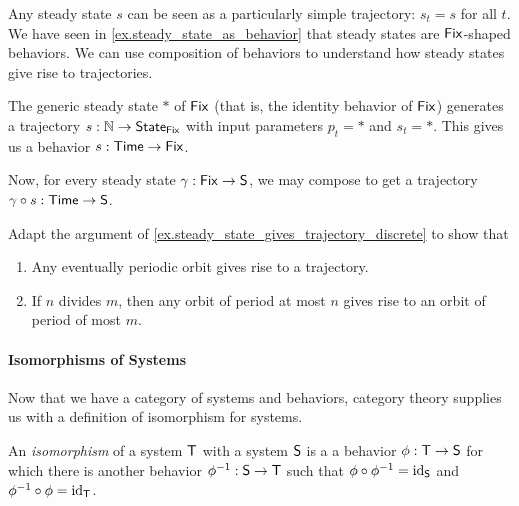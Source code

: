 \documentclass[DynamicalBook]{subfiles}
\begin{document}
\begin{example}\label{ex.steady_state_gives_trajectory_discrete}
  Any steady state $s$ can be seen as a particularly simple trajectory: $s_t =
  s$ for all $t$. We have seen in
  \cref{ex.steady_state_as_behavior}
  that steady states are $\mathsf{Fix}$-shaped behaviors. We can use composition of behaviors to
  understand how steady states give rise to trajectories.

  The generic steady state $\ast$ of $\mathsf{Fix}$ (that is, the identity behavior of
  $\mathsf{Fix}$) generates a trajectory $s : \mathbb{N} \to \mathsf{State}_{\mathsf{Fix}}$ with input
  parameters $p_t = \ast$ and $s_t = \ast$. This gives us a behavior $s :
  \mathsf{Time} \to \mathsf{Fix}$.
  
  Now, for every steady state $\gamma : \mathsf{Fix} \to \mathsf{S}$, we may compose
  to get a trajectory $\gamma \circ s : \mathsf{Time} \to \mathsf{S}$.
\end{example}

\begin{exercise}\label{ex.behaviors_as_change_of_kind_discrete}
Adapt the argument of \cref{ex.steady_state_gives_trajectory_discrete} to show
that
\begin{enumerate}
  \item Any eventually periodic orbit gives rise to a trajectory.
  \item If $n$ divides $m$, then any orbit of period at most $n$ gives rise to
    an orbit of period of most $m$.
\qedhere
\end{enumerate}
\end{exercise}


\paragraph{Isomorphisms of Systems}

Now that we have a category of systems and behaviors, category theory supplies
us with a definition of isomorphism for systems. 
\begin{definition}\label{def.isomorphism_of_systems_discrete}
  An \emph{isomorphism} of a system $\mathsf{T}$ with a system $\mathsf{S}$ is a
  a behavior $\phi : \mathsf{T} \to \mathsf{S}$ for which there is another behavior
  $\phi^{-1} : \mathsf{S} \to \mathsf{T}$ such that $\phi \circ \phi ^{-1} =
  \mathrm{id}_{\mathsf{S}}$ and $\phi ^{-1} \circ \phi = \mathrm{id}_{\mathsf{T}}$.
\end{definition}
\end{document}
